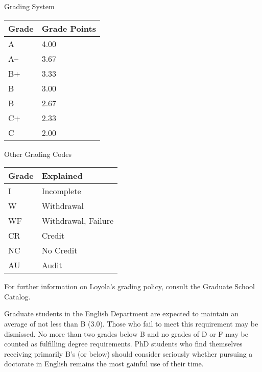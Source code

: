 \documentclass[letterpaper,10pt,english]{sphinxmanual}
\begin{document}
\begin{threeparttable}
\capstart\caption{Grading System}

\begin{tabulary}{\linewidth}{|L|L|}
\hline
\textbf{
Grade
} & \textbf{
Grade Points
}\\\hline

A
 & 
4.00
\\\hline

A–
 & 
3.67
\\\hline

B+
 & 
3.33
\\\hline

B
 & 
3.00
\\\hline

B–
 & 
2.67
\\\hline

C+
 & 
2.33
\\\hline

C
 & 
2.00
\\\hline
\end{tabulary}

\end{threeparttable}



\begin{threeparttable}
\capstart\caption{Other Grading Codes}

\begin{tabulary}{\linewidth}{|L|L|}
\hline
\textbf{
Grade
} & \textbf{
Explained
}\\\hline

I
 & 
Incomplete
\\\hline

W
 & 
Withdrawal
\\\hline

WF
 & 
Withdrawal, Failure
\\\hline

CR
 & 
Credit
\\\hline

NC
 & 
No Credit
\\\hline

AU
 & 
Audit
\\\hline
\end{tabulary}

\end{threeparttable}


For further information on Loyola’s grading policy, consult the Graduate School Catalog.

Graduate students in the English Department are expected to maintain an average of not less than B (3.0). Those who fail to meet this requirement may be dismissed. No more than two grades below B and no grades of D or F may be counted as fulfilling degree requirements. PhD students who find themselves receiving primarily B’s (or below) should consider seriously whether pursuing a doctorate in English remains the most gainful use of their time.
\end{document}
